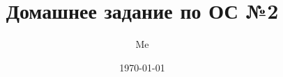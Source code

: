 \documentclass[12pt,a4paper,oneside]{article}
\title{Домашнее задание по ОС №2}
\author{Me}
\date{\today}
\begin{document}
  \sloppy
  \maketitle
  \tableofcontents
  \clearpage

  
\end{document}
